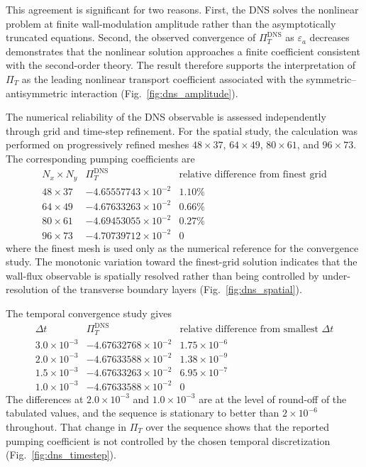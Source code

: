 \documentclass[12pt,a4paper]{article}
\newcommand{\PiT}{\Pi_T}
\begin{document}
This agreement is significant for two reasons. First, the DNS solves the
nonlinear problem at finite wall-modulation amplitude rather than the
asymptotically truncated equations. Second, the observed convergence of
$\PiT^{\mathrm{DNS}}$ as $\varepsilon_a$ decreases demonstrates that the nonlinear
solution approaches a finite coefficient consistent with the second-order
theory. The result therefore supports the interpretation of $\PiT$ as the
leading nonlinear transport coefficient associated with the
symmetric--antisymmetric interaction (Fig.~\ref{fig:dns_amplitude}).


The numerical reliability of the DNS observable is assessed independently
through grid and time-step refinement. For the spatial study, the calculation
was performed on progressively refined meshes
$48\times37$, $64\times49$, $80\times61$, and $96\times73$. The corresponding
pumping coefficients are
\begin{equation}
\begin{array}{c|c|c}
N_x\times N_y & \PiT^{\mathrm{DNS}} &
\text{relative difference from finest grid}\\
\hline
48\times37 & -4.65557743\times10^{-2} & 1.10\%\\
64\times49 & -4.67633263\times10^{-2} & 0.66\%\\
80\times61 & -4.69453055\times10^{-2} & 0.27\%\\
96\times73 & -4.70739712\times10^{-2} & 0
\end{array}
\end{equation}
where the finest mesh is used only as the numerical reference for the
convergence study. The monotonic variation toward the finest-grid solution
indicates that the wall-flux observable is spatially resolved rather than
being controlled by under-resolution of the transverse boundary layers
(Fig.~\ref{fig:dns_spatial}).

The temporal convergence study gives
\begin{equation}
\begin{array}{c|c|c}
\Delta t & \PiT^{\mathrm{DNS}} &
\text{relative difference from smallest }\Delta t\\
\hline
3.0\times10^{-3}
& -4.67632768\times10^{-2}
& 1.75\times10^{-6}\\
2.0\times10^{-3}
& -4.67633588\times10^{-2}
& 1.38\times10^{-9}\\
1.5\times10^{-3}
& -4.67633263\times10^{-2}
& 6.95\times10^{-7}\\
1.0\times10^{-3}
& -4.67633588\times10^{-2}
& 0
\end{array}
\end{equation}
The differences at $2.0\times10^{-3}$ and $1.0\times10^{-3}$ are at the level of
round-off of the tabulated values, and the sequence is stationary to better than
$2\times10^{-6}$ throughout. That change in $\PiT$ over the sequence shows that the reported
pumping coefficient is not controlled by the chosen temporal discretization
(Fig.~\ref{fig:dns_timestep}).
\end{document}

